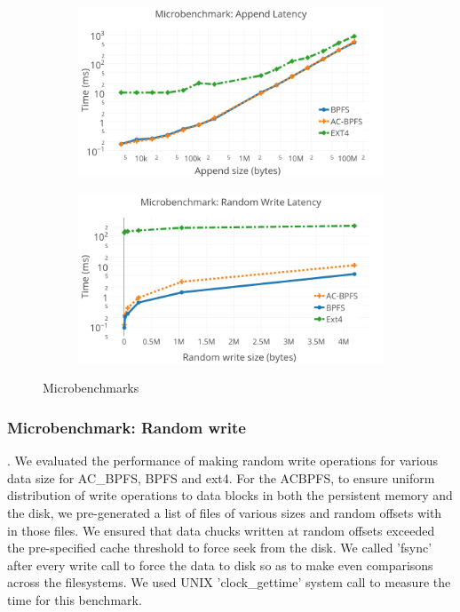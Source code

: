  \begin{figure}[t]\centering
\begin{subfigure}{.60\textwidth}
  \centering
  \includegraphics[width=\linewidth]{figs/append.png}
\end{subfigure}
\begin{subfigure}{.60\textwidth}
  \centering
  \includegraphics[width=\textwidth]{figs/write.png}
\vspace{-0.2in}
\end{subfigure}
\caption{Microbenchmarks}
\label{fig:fig}
\end{figure}

\subsubsection{Microbenchmark: Random write}
. We evaluated the performance of making random write operations for various data size for AC\_BPFS, BPFS and ext4. For the AC\-BPFS, to ensure uniform distribution of write operations to data blocks in both the persistent memory and the disk, we pre-generated a list of files of various sizes and random offsets with in those files. We ensured that data chucks written at random offsets exceeded the pre-specified cache threshold to force seek from the disk. We called 'fsync' after every write call to force the data to disk so as to make even comparisons across the filesystems. We used UNIX 'clock\_gettime' system call to measure the time for this benchmark.

